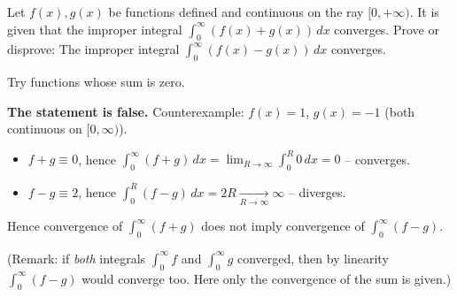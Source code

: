 
\begin{question}
Let $f(x),g(x)$ be functions defined and continuous on the ray $[0,+\infty)$. It is given that the improper integral $\int_0^\infty(f(x)+g(x))\,dx$ converges.
Prove or disprove:
The improper integral $\int_0^\infty(f(x)-g(x))\,dx$ converges.
\end{question}

\begin{hint}
Try functions whose sum is zero.
\end{hint}

\begin{solution}
\textbf{The statement is false.} Counterexample: $f(x)=1$, $g(x)=-1$ (both continuous on $[0,\infty)$).
\begin{itemize}
  \item $f+g\equiv0$, hence $\int_0^\infty(f+g)\,dx=\lim_{R\to\infty}\int_0^R0\,dx=0$ -- converges.
  \item $f-g\equiv2$, hence $\int_0^R(f-g)\,dx=2R\xrightarrow[R\to\infty]{}\infty$ -- diverges.
\end{itemize}
Hence convergence of $\int_0^\infty(f+g)$ does not imply convergence of $\int_0^\infty(f-g)$.

(Remark: if \emph{both} integrals $\int_0^\infty f$ and $\int_0^\infty g$ converged, then by linearity $\int_0^\infty(f-g)$ would converge too. Here only the convergence of the sum is given.)
\end{solution}
